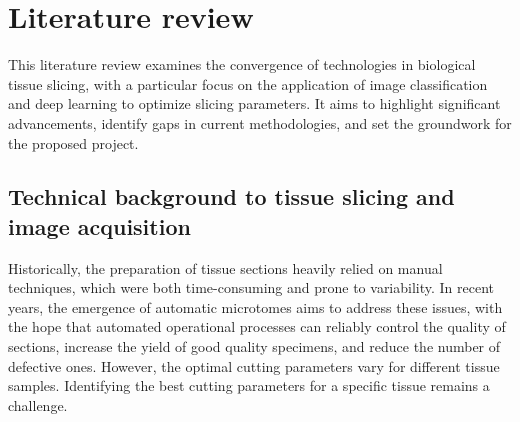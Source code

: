 





\section{Literature review}

This literature review examines the convergence of technologies in biological tissue slicing, with a particular focus on the application of image classification and deep learning to optimize slicing parameters. It aims to highlight significant advancements, identify gaps in current methodologies, and set the groundwork for the proposed project.

\subsection{Technical background to tissue slicing and image acquisition}

Historically, the preparation of tissue sections heavily relied on manual techniques, which were both time-consuming and prone to variability. In recent years, the emergence of automatic microtomes aims to address these issues, with the hope that automated operational processes can reliably control the quality of sections, increase the yield of good quality specimens, and reduce the number of defective ones. However, the optimal cutting parameters vary for different tissue samples. Identifying the best cutting parameters for a specific tissue remains a challenge.

